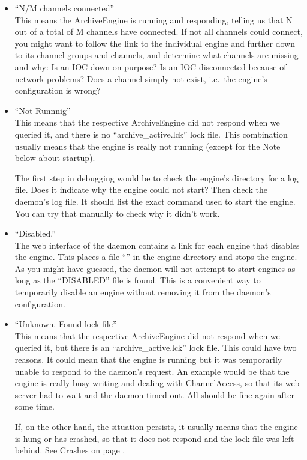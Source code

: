 \begin{itemize}
\item ``N/M channels connected''\\
      This means the ArchiveEngine is running and responding,
      telling us that N out of a total of M channels have connected.
      If not all channels could connect, you might want to follow
      the link to the individual engine and further down to its
      channel groups and channels, and determine what channels are
      missing and why: Is an IOC down on purpose? Is an IOC
      disconnected because of network problems? Does a channel simply
      not exist, i.e.\ the engine's configuration is wrong?
\item ``Not Runnnig''\\
      This means that the respective ArchiveEngine did not respond
      when we queried it, and there is no ``archive\_active.lck'' lock
      file. This combination usually means that the engine is really
      not running (except for the Note below about startup).

      The first step in debugging would be to check the engine's
      directory for a log file. Does it indicate why the engine could
      not start? Then check the daemon's log file. It should list the
      exact command used to start the engine. You can try that
      manually to check why it didn't work.
\item ``Disabled.''\\
      The web interface of the daemon contains a link for each engine
      that disables the engine. This places a file
      ``'' in the engine directory and stops the
      engine.  As you might have guessed, the daemon will not attempt
      to start engines as long as the ``DISABLED'' file is found. This
      is a convenient way to temporarily disable an engine without
      removing it from the daemon's configuration.
\item ``Unknown. Found lock file''\\
      This means that the respective ArchiveEngine did not respond
      when we queried it, but there is an ``archive\_active.lck'' lock
      file. This could have two reasons. It could mean that the engine
      is running but it was temporarily unable to respond to the
      daemon's request. An example would be that the engine is really
      busy writing and dealing with ChannelAccess, so that its web
      server had to wait and the daemon timed out. All should be fine
      again after some time.

      If, on the other hand, the situation persists, it usually means
      that the engine is hung or has crashed, so that it does not
      respond and the lock file was left behind.
      See Crashes on page \pageref{sec:crash}.
\end{itemize}

